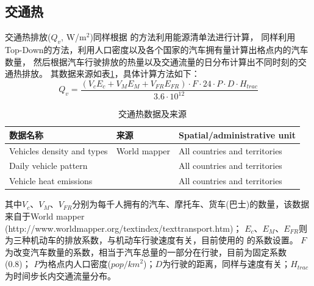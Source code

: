 \subsection{交通热}
交通热排放($Q_v$, W/m$^2$)同样根据 \citet{allen2011} 的方法利用能源清单法进行计算，
同样利用Top-Down的方法，利用人口密度以及各个国家的汽车拥有量计算出格点内的汽车数量，
然后根据汽车行驶排放的热量以及交通流量的日分布计算出不同时刻的交通热排放。
其数据来源如表\ref{tab:交通热数据及来源}，具体计算方法如下：
\begin{equation}
Q_{v}=\frac{\left(V_{c} E_{c}+V_{M} E_{M}+V_{F R} E_{F R}\right) \cdot F \cdot 24 \cdot P \cdot D \cdot H_{t r a c}}{3.6 \cdot 10^{12}}
\end{equation}
\begin{table}[]
    \centering
\caption{交通热数据及来源}
\label{tab:交通热数据及来源}
    \begin{tabular}{@{}lll@{}}
    \toprule
    数据名称                       & 来源                          & Spatial/administrative unit   \\ \midrule
    Vehicles density and types & World mapper                & All countries and territories \\
    Daily vehicle pattern      & \citet{Hallenbeck1997} & All countries and territories \\
    Vehicle heat emissions     & \citet{smith2009estimating}       & All countries and territories \\ \bottomrule
    \end{tabular}
    \end{table}
其中$V_c$、$V_M$、$V_{FR}$分别为每千人拥有的汽车、摩托车、货车(巴士)的数量，该数据来自于World mapper
(http://www.worldmapper.org/textindex/texttransport.htm)；
$E_c$、$E_M$、$E_{FR}$则为三种机动车的排放系数，与机动车行驶速度有关，目前使用的 \citet{smith2009estimating} 的系数设置。
$F$为改变汽车数量的系数，相当于汽车总量的一部分在行驶，目前为固定系数(0.8)；
$P$为格点内人口密度($pop/{km}^2$)；$D$为行驶的距离，同样与速度有关；$H_{trac}$为时间步长内交通流量分布。
